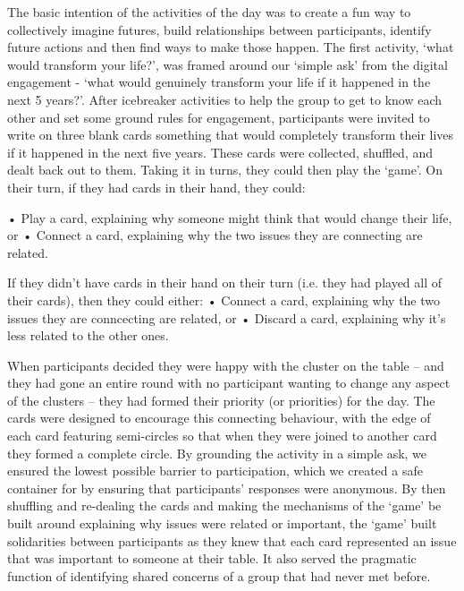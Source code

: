 The basic intention of the activities of the day was to create a fun way to collectively imagine futures, build relationships between participants, identify future actions and then find ways to make those happen. The first activity, ‘what would transform your life?’, was framed around our ‘simple ask’ from the digital engagement -  ‘what would genuinely transform your life if it happened in the next 5 years?’. After icebreaker activities to help the group to get to know each other and set some ground rules for engagement, participants were invited to write on three blank cards something that would completely transform their lives if it happened in the next five years. These cards were collected, shuffled, and dealt back out to them. Taking it in turns, they could then play the ‘game’. On their turn, if they had cards in their hand, they could:

•	Play a card, explaining why someone might think that would change their life, or
•	Connect a card, explaining why the two issues they are connecting are related.

If they didn’t have cards in their hand on their turn (i.e. they had played all of their cards), then they could either:
•	Connect a card, explaining why the two issues they are conncecting are related, or
•	Discard a card, explaining why it’s less related to the other ones.

When participants decided they were happy with the cluster on the table – and they had gone an entire round with no participant wanting to change any aspect of the clusters – they had formed their priority (or priorities) for the day. The cards were designed to encourage this connecting behaviour, with the edge of each card featuring semi-circles so that when they were joined to another card they formed a complete circle. By grounding the activity in a simple ask, we ensured the lowest possible barrier to participation, which we created a safe container for by ensuring that participants’ responses were anonymous. By then shuffling and re-dealing the cards and making the mechanisms of the ‘game’ be built around explaining why issues were related or important, the ‘game’ built solidarities between participants as they knew that each card represented an issue that was important to someone at their table. It also served the pragmatic function of identifying shared concerns of a group that had never met before.  

